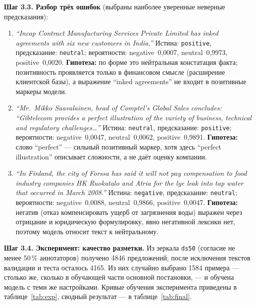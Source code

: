 \documentclass[14pt,a4paper]{extarticle}
\begin{document}
\textbf{Шаг 3.3. Разбор трёх ошибок} (выбраны наиболее уверенные неверные
предсказания):

\begin{enumerate}
    \item \textit{``Incap Contract Manufacturing Services Private Limited has inked
    agreements with six new customers in India.''} Истина: \texttt{positive},
    предсказание: \texttt{neutral}; вероятности: negative~0{,}0007,
    neutral~0{,}9973, positive~0{,}0020. \textbf{Гипотеза:} по форме это
    нейтральная констатация факта; позитивность проявляется только в финансовом
    смысле (расширение клиентской базы), а выражение ``inked agreements'' не
    входит в позитивные маркеры модели.
    \item \textit{``Mr.~Mikko Saavalainen, head of Comptel's Global Sales concludes:
    ``Gibtelecom provides a perfect illustration of the variety of business,
    technical and regulatory challenges\ldots''} Истина: \texttt{neutral},
    предсказание: \texttt{positive}; вероятности: negative~0{,}0047,
    neutral~0{,}0062, positive~0{,}9891. \textbf{Гипотеза:} слово ``perfect'' ---
    сильный позитивный маркер, хотя здесь ``perfect illustration'' описывает
    сложности, а не даёт оценку компании.
    \item \textit{``In Finland, the city of Forssa has said it will not pay
    compensation to food industry companies HK Ruokatalo and Atria for the lye leak
    into tap water that occurred in March 2008.''} Истина: \texttt{negative},
    предсказание: \texttt{neutral}; вероятности: negative~0{,}0088,
    neutral~0{,}9866, positive~0{,}0047. \textbf{Гипотеза:} негатив (отказ
    компенсировать ущерб от загрязнения воды) выражен через отрицание и юридическую
    формулировку, явно негативной лексики нет, поэтому модель относит текст к
    нейтральному.
\end{enumerate}

\textbf{Шаг 3.4. Эксперимент: качество разметки.} Из зеркала \texttt{ds50}
(согласие не менее 50\,\% аннотаторов) получено 4846 предложений; после исключения
текстов валидации и теста осталось 4165. Из них случайно выбрано 1584 примера ---
столько же, сколько в обучающей части основной постановки, --- и обучена модель с
теми же настройками. Кривые обучения эксперимента приведены в таблице~\ref{tab:exp},
сводный результат --- в таблице~\ref{tab:final}.
\end{document}
